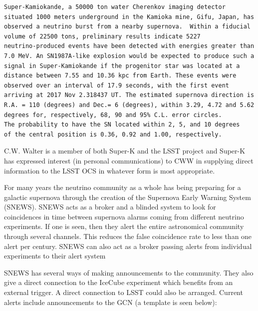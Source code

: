 \documentclass[12pt, letterpaper]{article}
\newcommand{\superk}  {Super\nobreakdash-K\xspace}
\begin{document}
\begin{verbatim}
Super-Kamiokande, a 50000 ton water Cherenkov imaging detector
situated 1000 meters underground in the Kamioka mine, Gifu, Japan, has
observed a neutrino burst from a nearby supernova.  Within a fiducial
volume of 22500 tons, preliminary results indicate 5227
neutrino-produced events have been detected with energies greater than
7.0 MeV. An SN1987A-like explosion would be expected to produce such a
signal in Super-Kamiokande if the progenitor star was located at a
distance between 7.55 and 10.36 kpc from Earth. These events were
observed over an interval of 17.9 seconds, with the first event
arriving at 2017 Nov 2.318437 UT. The estimated supernova direction is
R.A. = 110 (degrees) and Dec.= 6 (degrees), within 3.29, 4.72 and 5.62
degrees for, respectively, 68, 90 and 95% C.L. error circles. 
The probability to have the SN located within 2, 5, and 10 degrees 
of the central position is 0.36, 0.92 and 1.00, respectively.
\end{verbatim}

C.W. Walter is a member of both \superk and the LSST project and
\superk has expressed interest (in personal communications) to CWW in
supplying direct information to the LSST OCS in whatever form is most
appropriate.

For many years the neutrino community as a whole has being preparing
for a galactic supernova through the creation of the Supernova Early
Warning System (SNEWS).  SNEWS acts as a
broker and a blinded system to look for coincidences in time between
supernova alarms coming from different neutrino experiments. If one is
seen, then they alert the entire astronomical community through several
channels. This reduces the false coincidence rate to less than one
alert per century. SNEWS can also act as a broker passing alerts from
individual experiments to their alert system

SNEWS has several ways of making announcements to the community.  They
also give a direct connection to the IceCube experiment which benefits
from an external trigger.  A direct connection to LSST could also be
arranged.  Current  alerts include announcements to the GCN (a
template is seen below):
\end{document}

